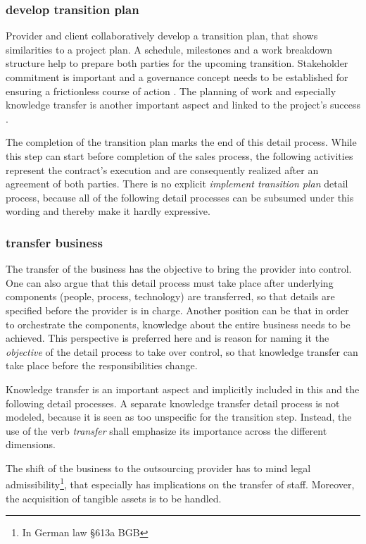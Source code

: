 	\subsubsection{develop transition plan}
	Provider and client collaboratively develop a transition plan, that shows similarities to a project plan. A schedule, milestones and a work breakdown structure help to prepare both parties for the upcoming transition. Stakeholder commitment is important and a governance concept needs to be established for ensuring a frictionless course of action \citep{itgov2005}. The planning of work and especially knowledge transfer is another important aspect and linked to the project's success \citep{deloittehandbook}. 
	
	The completion of the transition plan marks the end of this detail process. While this step can start before completion of the sales process, the following activities represent the contract's execution and are consequently realized after an agreement of both parties. There is no explicit \textit{implement transition plan} detail process, because all of the following detail processes can be subsumed under this wording and thereby make it hardly expressive. 
	
	\subsubsection{transfer business}
	
	The transfer of the business has the objective to bring the provider into control. One can also argue that this detail process must take place after underlying components (\ie people, process, technology) are transferred, so that details are specified before the provider is in charge. Another position can be that in order to orchestrate the components, knowledge about the entire business needs to be achieved. This perspective is preferred here and is reason for naming it the \textit{objective} of the detail process to take over control, so that knowledge transfer can take place before the responsibilities change. 
	
	Knowledge transfer is an important aspect and implicitly included in this and the following detail processes. A separate knowledge transfer detail process is not modeled, because it is seen as too unspecific for the transition step. Instead, the use of the verb \textit{transfer} shall emphasize its importance across the different dimensions. 
	
	The shift of the business to the outsourcing provider has to mind legal admissibility\footnote{In German law \cf §613a BGB }, that especially has implications on the transfer of staff. Moreover, the acquisition of tangible assets is to be handled. 
	
